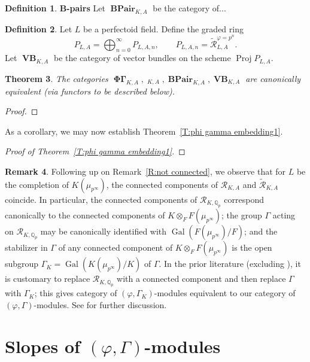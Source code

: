 \documentclass[12pt]{amsart}
\newtheorem{theorem}{Theorem}[section]
\theoremstyle{definition}
\newtheorem{defn}[theorem]{Definition}
\newtheorem{remark}[theorem]{Remark}
\numberwithin{equation}{theorem}
\newcommand{\QQ}{\mathbb{Q}}
\newcommand{\calR}{\mathcal{R}}
\DeclareMathOperator{\BPair}{\mathbf{BPair}}
\DeclareMathOperator{\Gal}{Gal}
\DeclareMathOperator{\PhiGamma}{\mathbf{\Phi \Gamma}}
\DeclareMathOperator{\PhiGammatilde}{\widetilde{\mathbf{\Phi \Gamma}}}
\DeclareMathOperator{\Proj}{Proj}
\DeclareMathOperator{\VB}{\mathbf{VB}}
\begin{document}
\begin{defn}
\textbf{B-pairs}
Let $\BPair_{K,A}$ be the category of...
\end{defn}

\begin{defn}
Let $L$ be a perfectoid field. Define the graded ring
\[
P_{L,A} = \bigoplus_{n=0}^\infty P_{L,A,n}, \qquad P_{L,A,n} = \tilde{\calR}_{L,A}^{\varphi=p^n}.
\]
Let $\VB_{K,A}$ be the category of vector bundles on the scheme $\Proj P_{L,A}$.
\end{defn}

\begin{theorem}
The categories $\PhiGamma_{K,A}, \PhiGammatilde_{K,A}, \BPair_{K,A}, \VB_{K,A}$ are canonically equivalent (via functors to be described below).
\end{theorem}
\begin{proof}
\end{proof}

As a corollary, we may now establish Theorem~\ref{T:phi gamma embedding1}.
\begin{proof}[Proof of Theorem~\ref{T:phi gamma embedding1}]
\end{proof}

\begin{remark} \label{R:not connected2}
Following up on Remark~\ref{R:not connected}, we observe that for $L$ be the completion of $K(\mu_{p^\infty})$, the connected components of $\calR_{K,A}$ and $\tilde{\calR}_{K,A}$ coincide. In particular, the connected components of $\calR_{K,\QQ_p}$ correspond canonically to the connected components of $K \otimes_F F(\mu_{p^\infty})$; the group $\Gamma$ acting on $\calR_{K,\QQ_p}$ may be canonically identified with $\Gal(F(\mu_{p^\infty})/F)$; and the stabilizer in $\Gamma$ of any connected component of $K \otimes_F F(\mu_{p^\infty})$ is
the open subgroup $\Gamma_K = \Gal(K(\mu_{p^\infty})/K)$ of $\Gamma$. In the prior literature (excluding \cite{kedlaya-new-phigamma}), it is customary to replace $\calR_{K,\QQ_p}$ with a connected component and then replace $\Gamma$ with $\Gamma_K$; this gives category of $(\varphi, \Gamma_K)$-modules equivalent to our category of $(\varphi, \Gamma)$-modules. See \cite[Remark~2.2.12]{kedlaya-new-phigamma} for further discussion.
\end{remark}


\section{Slopes of $(\varphi, \Gamma)$-modules}
\end{document}
